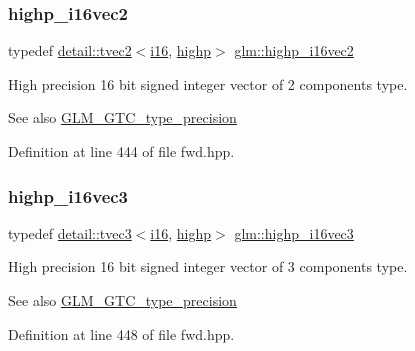 \subsubsection{\texorpdfstring{highp\+\_\+i16vec2}{highp\_i16vec2}}
{\footnotesize\ttfamily typedef \hyperlink{structglm_1_1detail_1_1tvec2}{detail\+::tvec2}$<$\hyperlink{group__gtc__type__precision_ga35e5542ca05b29cc256fdafb8503d1fd}{i16}, \hyperlink{namespaceglm_a0f04f086094c747d227af4425893f545ac6f7eab42eacbb10d59a58e95e362074}{highp}$>$ \hyperlink{group__gtc__type__precision_ga74df9e215c049f82d277473c4c974bb4}{glm\+::highp\+\_\+i16vec2}}

High precision 16 bit signed integer vector of 2 components type. \begin{DoxySeeAlso}{See also}
\hyperlink{group__gtc__type__precision}{G\+L\+M\+\_\+\+G\+T\+C\+\_\+type\+\_\+precision} 
\end{DoxySeeAlso}


Definition at line 444 of file fwd.\+hpp.

\mbox{\label{group__gtc__type__precision_ga8dcfd412bd9ce99a1cf5c2b6e50f07e7}} 
\subsubsection{\texorpdfstring{highp\+\_\+i16vec3}{highp\_i16vec3}}
{\footnotesize\ttfamily typedef \hyperlink{structglm_1_1detail_1_1tvec3}{detail\+::tvec3}$<$\hyperlink{group__gtc__type__precision_ga35e5542ca05b29cc256fdafb8503d1fd}{i16}, \hyperlink{namespaceglm_a0f04f086094c747d227af4425893f545ac6f7eab42eacbb10d59a58e95e362074}{highp}$>$ \hyperlink{group__gtc__type__precision_ga8dcfd412bd9ce99a1cf5c2b6e50f07e7}{glm\+::highp\+\_\+i16vec3}}

High precision 16 bit signed integer vector of 3 components type. \begin{DoxySeeAlso}{See also}
\hyperlink{group__gtc__type__precision}{G\+L\+M\+\_\+\+G\+T\+C\+\_\+type\+\_\+precision} 
\end{DoxySeeAlso}


Definition at line 448 of file fwd.\+hpp.

\mbox{\label{group__gtc__type__precision_ga7fd6f1b3c224833cc330a2c64b6994dd}} 
